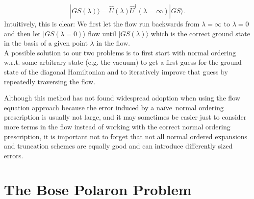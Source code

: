 \begin{equation}
|GS(\lambda)\rangle = \hat U(\lambda)\hat U^\dagger(\lambda=\infty)|GS\rangle.
\end{equation}
Intuitively, this is clear: We first let the flow run backwards from $\lambda=\infty$ to $\lambda = 0$ and then let $|GS(\lambda=0)\rangle$ flow until $|GS(\lambda)\rangle$ which is the correct ground state in the basis of a given point $\lambda$ in the flow.\\
A possible solution to our two problems is to first start with normal ordering w.r.t. some arbitrary state (e.g. the vacuum) to get a first guess for the ground state of the diagonal Hamiltonian and to iteratively improve that guess by repeatedly traversing the flow. \par
Although this method has not found widespread adoption when using the flow equation approach because the error induced by a \grqq na\"ive\grqq\  normal ordering prescription is usually not large, and it may sometimes be easier just to consider more terms in the flow instead of working with the correct normal ordering prescription, it is important not to forget that not all normal ordered expansions and truncation schemes are equally good and can introduce differently sized errors.

\section{The Bose Polaron Problem}
